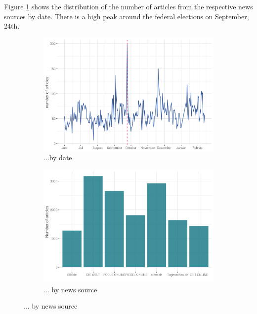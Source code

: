 \documentclass[12pt,a4paper,notitlepage]{article}
\begin{document}
Figure \ref{fig_distr1} shows the distribution of the number of articles from the respective news sources by date. There is a high peak around the federal elections on September, 24th.  

\begin{figure}[H]
	\caption{Article distribution...}
	\begin{center}
		\begin{subfigure}[normla]{0.49\textwidth}
			\includegraphics[width=\textwidth]{../figs/timeline.png}
			\caption{...by date}
			\label{fig_distr1}
		\end{subfigure}
		\begin{subfigure}[normla]{0.49\textwidth}
			\includegraphics[width=\textwidth]{../figs/bar.png}
			\caption{... by news source}
			\label{fig_distr2}
		\end{subfigure}
	\end{center}
\end{figure}
\end{document}

